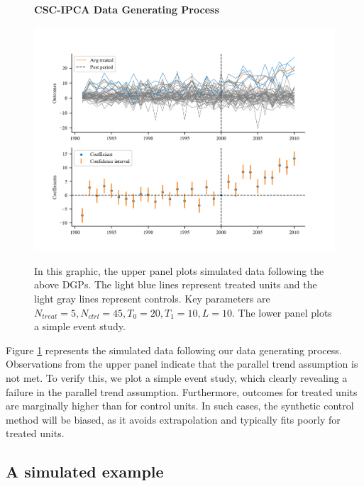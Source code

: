 \documentclass[12pt]{article}
\begin{document}
\begin{figure}[!ht]
    \centering
    \caption{\textbf{CSC-IPCA Data Generating Process}}
    \includegraphics{figs/data_plot.png}
    \label{fig: sim}
    \caption*{\footnotesize{In this graphic, the upper panel plots simulated data following the above DGPs. The light blue lines represent treated units and the light gray lines represent controls. Key parameters are $N_{treat} = 5, N_{ctrl} = 45, T_0=20, T_1=10, L=10$. The lower panel plots a simple event study.}}
    \end{figure}

Figure \ref{fig: sim} represents the simulated data following our data generating process. Observations from the upper panel indicate that the parallel trend assumption is not met. To verify this, we plot a simple event study, which clearly revealing a failure in the parallel trend assumption. Furthermore, outcomes for treated units are marginally higher than for control units. In such cases, the synthetic control method will be biased, as it avoids extrapolation and typically fits poorly for treated units.


\subsection{A simulated example}
\end{document}
